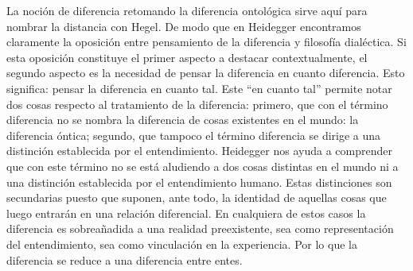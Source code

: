La noción de diferencia retomando la diferencia ontológica sirve aquí para nombrar la distancia con Hegel. De modo que en Heidegger encontramos claramente la oposición entre pensamiento de la diferencia y filosofía dialéctica. Si esta oposición constituye el primer aspecto a destacar contextualmente, el segundo aspecto es la necesidad de pensar la diferencia en cuanto diferencia. Esto significa: pensar la diferencia en cuanto tal. Este \enquote{en cuanto tal} permite notar dos cosas respecto al tratamiento de la diferencia: primero, que con el término diferencia no se nombra la diferencia de cosas existentes en el mundo: la diferencia óntica; segundo, que tampoco el término diferencia se dirige a una distinción establecida por el entendimiento. Heidegger nos ayuda a comprender que con este término no se está aludiendo a dos cosas distintas en el mundo ni a una distinción establecida por el entendimiento humano. Estas distinciones son secundarias puesto que suponen, ante todo, la identidad de aquellas cosas que luego entrarán en una relación diferencial. En cualquiera de estos casos la diferencia es sobreañadida a una realidad preexistente, sea como representación del entendimiento, sea como vinculación en la experiencia. Por lo que la diferencia se reduce a una diferencia entre entes.

